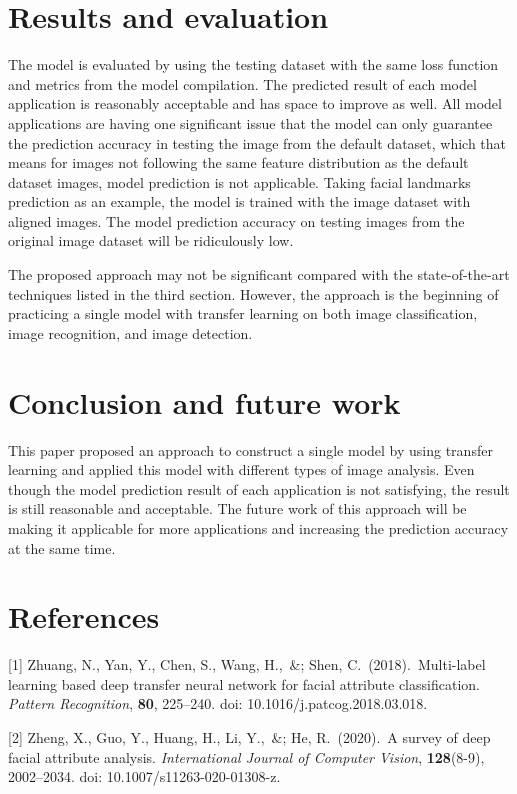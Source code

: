 \documentclass{article}
\begin{document}
\section{Results and evaluation}
\label{result}
The model is evaluated by using the testing dataset with the same loss function and metrics from the model compilation. The predicted result of each model application is reasonably acceptable and has space to improve as well. All model applications are having one significant issue that the model can only guarantee the prediction accuracy in testing the image from the default dataset, which that means for images not following the same feature distribution as the default dataset images, model prediction is not applicable. Taking facial landmarks prediction as an example, the model is trained with the image dataset with aligned images. The model prediction accuracy on testing images from the original image dataset will be ridiculously low. 

The proposed approach may not be significant compared with the state-of-the-art techniques listed in the third section. However, the approach is the beginning of practicing a single model with transfer learning on both image classification, image recognition, and image detection. 


\section{Conclusion and future work}
\label{future}
This paper proposed an approach to construct a single model by using transfer learning and applied this model with different types of image analysis. Even though the model prediction result of each application is not satisfying, the result is still reasonable and acceptable. The future work of this approach will be making it applicable for more applications and increasing the prediction accuracy at the same time.


\section*{References}

\small

[1] Zhuang, N., Yan, Y., Chen, S., Wang, H.,\ \&; Shen, C.\ (2018).\ Multi-label learning based deep transfer neural network for facial attribute classification. {\it Pattern Recognition}, {\bf80}, 225–240. doi: 10.1016/j.patcog.2018.03.018.

[2] Zheng, X., Guo, Y., Huang, H., Li, Y.,\ \&; He, R.\ (2020).\ A survey of deep facial attribute analysis. {\it International Journal of Computer Vision}, {\bf128}(8-9), 2002–2034. doi: 10.1007/s11263-020-01308-z.
\end{document}
